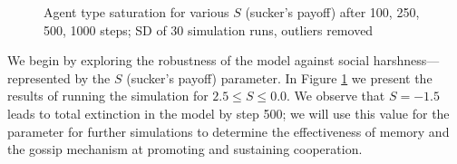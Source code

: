 \documentclass[english]{article}
\begin{document}
\begin{figure}[!ht]
  \centering
  \caption{Agent type saturation for various $S$ (sucker's payoff) after 100, 250, 500, 1000 steps; SD of 30 simulation runs, outliers removed}
  \label{fig:agent_sat/S-memory0gossip0}
\end{figure}

We begin by exploring the robustness of the model against social harshness---represented by the $S$ (sucker's payoff) parameter.
In Figure \ref{fig:agent_sat/S-memory0gossip0} we present the results of running the simulation for $2.5 \leq S \leq 0.0$.
We observe that $S = -1.5$ leads to total extinction in the model by step 500;
we will use this value for the parameter for further simulations to determine the effectiveness of memory and the gossip mechanism at promoting and sustaining cooperation.
\end{document}
